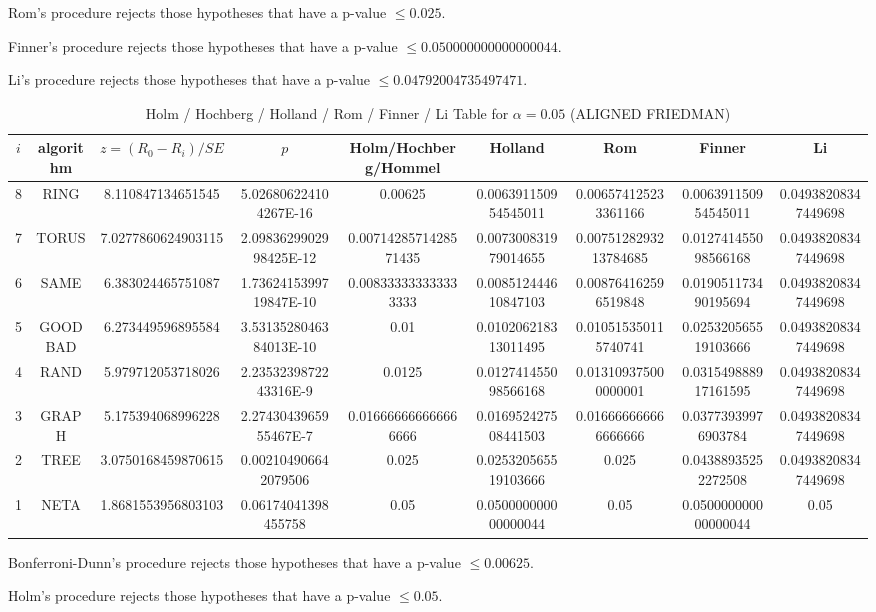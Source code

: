 \documentclass[a4paper,10pt]{article}
\begin{document}
\begin{landscape}
Rom's procedure rejects those hypotheses that have a p-value $\le0.025$.


Finner's procedure rejects those hypotheses that have a p-value $\le0.050000000000000044$.


Li's procedure rejects those hypotheses that have a p-value $\le0.04792004735497471$.



\newpage

\begin{table}[!htp]
\centering\scriptsize
\caption{Holm / Hochberg / Holland / Rom / Finner / Li Table for $\alpha=0.05$ (ALIGNED FRIEDMAN)}
\begin{tabular}{ccccccccc}
$i$&algorithm&$z=(R_0 - R_i)/SE$&$p$&Holm/Hochberg/Hommel&Holland&Rom&Finner&Li\\
\hline
8& RING&8.110847134651545&5.026806224104267E-16&0.00625&0.006391150954545011&0.006574125233361166&0.006391150954545011&0.04938208347449698\\
7& TORUS&7.0277860624903115&2.0983629902998425E-12&0.0071428571428571435&0.007300831979014655&0.0075128293213784685&0.012741455098566168&0.04938208347449698\\
6& SAME&6.383024465751087&1.7362415399719847E-10&0.008333333333333333&0.008512444610847103&0.008764162596519848&0.019051173490195694&0.04938208347449698\\
5& GOODBAD&6.273449596895584&3.5313528046384013E-10&0.01&0.010206218313011495&0.010515350115740741&0.025320565519103666&0.04938208347449698\\
4& RAND&5.979712053718026&2.2353239872243316E-9&0.0125&0.012741455098566168&0.013109375000000001&0.031549888917161595&0.04938208347449698\\
3& GRAPH&5.175394068996228&2.2743043965955467E-7&0.016666666666666666&0.016952427508441503&0.016666666666666666&0.03773939976903784&0.04938208347449698\\
2& TREE&3.0750168459870615&0.002104906642079506&0.025&0.025320565519103666&0.025&0.04388935252272508&0.04938208347449698\\
1& NETA&1.8681553956803103&0.06174041398455758&0.05&0.050000000000000044&0.05&0.050000000000000044&0.05\\
\hline
\end{tabular}
\end{table}
Bonferroni-Dunn's procedure rejects those hypotheses that have a p-value $\le0.00625$.


Holm's procedure rejects those hypotheses that have a p-value $\le0.05$.



\end{landscape}
\end{document}
